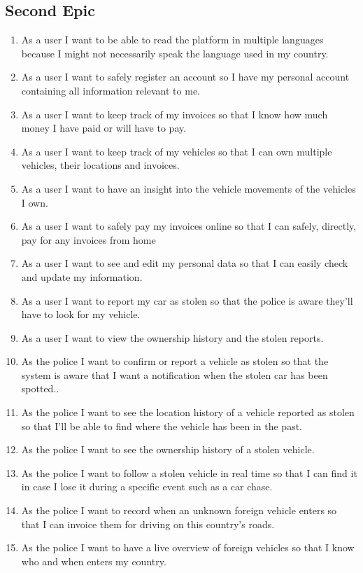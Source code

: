 \subsection{Second Epic}
\begin{enumerate}
	\item As a user I want to be able to read the platform in multiple languages because I might not necessarily speak the language used in my country.
	\item As a user I want to safely register an account so I have my personal account containing all information relevant to me.
	\item As a user I want to keep track of my invoices so that I know how much money I have paid or will have to pay.
	\item As a user I want to keep track of my vehicles so that I can own multiple vehicles, their locations and invoices.
	\item As a user I want to have an insight into the vehicle movements of the vehicles I own.
	\item As a user I want to safely pay my invoices online so that I can safely, directly, pay for any invoices from home
	\item As a user I want to see and edit my personal data so that I can easily check and update my information.
	\item As a user I want to report my car as stolen so that the police is aware they’ll have to look for my vehicle.
	\item As a user I want to view the ownership history and the stolen reports.
	\item As the police I want to confirm or report a vehicle as stolen so that the system is aware that I want a notification when the stolen car has been spotted..
	\item As the police I want to see the location history of a vehicle reported as stolen so that I’ll be able to find where the vehicle has been in the past.
	\item As the police I want to see the ownership history of a stolen vehicle.
	\item As the police I want to follow a stolen vehicle in real time so that I can find it in case I lose it during a specific event such as a car chase.
	\item As the police I want to record when an unknown foreign vehicle enters so that I can invoice them for driving on this country’s roads.
	\item As the police I want to have a live overview of foreign vehicles so that I know who and when enters my country.

\end{enumerate}
